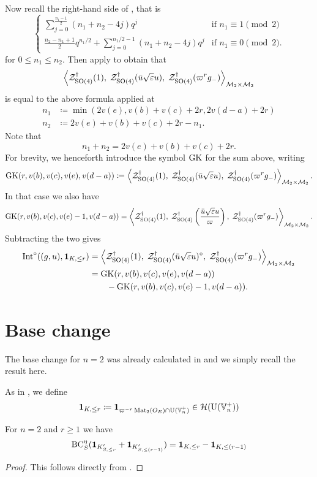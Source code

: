 Now recall the right-hand side of , that is
\[
  \begin{cases}
    \sum_{j=0}^{\frac{n_1-1}{2}} (n_1+n_2-4j) q^j & \text{if } n_1 \equiv 1 \pmod 2 \\
    \frac{n_2-n_1+1}{2} q^{n_1/2} + \sum_{j=0}^{n_1/2-1} (n_1+n_2-4j) q^j & \text{if } n_1 \equiv 0 \pmod 2.
  \end{cases}
\]
for $0 \le n_1 \le n_2$.
Then apply  to obtain that
\[
  \left< \mathcal Z^{\dagger}_{\operatorname{SO}(4)}(1), \;
    \mathcal Z^{\dagger}_{\operatorname{SO}(4)}(\bar u \sqrt{\varepsilon} u), \;
    \mathcal Z^{\dagger}_{\operatorname{SO}(4)}(\varpi^r g_-) \right>_{\mathcal M_2 \times \mathcal M_2}
\]
is equal to the above formula applied at
\begin{align*}
  n_1 &\coloneqq \min(2v(e), v(b)+v(c)+2r, 2v(d-a)+2r) \\
  n_2 &\coloneqq 2v(e) + v(b) + v(c) + 2r - n_1.
\end{align*}
Note that
\[ n_1 + n_2 = 2v(e) + v(b) + v(c) + 2r. \]
For brevity, we henceforth introduce the symbol $\operatorname{GK}$ for the sum above, writing
\[ \operatorname{GK}(r, v(b), v(c), v(e), v(d-a)) \coloneqq
  \left< \mathcal Z^{\dagger}_{\operatorname{SO}(4)}(1), \;
    \mathcal Z^{\dagger}_{\operatorname{SO}(4)}(\bar u \sqrt{\varepsilon} u), \;
    \mathcal Z^{\dagger}_{\operatorname{SO}(4)}(\varpi^r g_-) \right>_{\mathcal M_2 \times \mathcal M_2}. \]
In that case we also have
\[\operatorname{GK}(r, v(b), v(c), v(e)-1, v(d-a)) = \left< \mathcal Z^{\dagger}_{\operatorname{SO}(4)}(1), \;
    \mathcal Z^{\dagger}_{\operatorname{SO}(4)}\left(\frac{\bar u \sqrt{\varepsilon} u}{\varpi}\right), \;
    \mathcal Z^{\dagger}_{\operatorname{SO}(4)}(\varpi^r g_-) \right>_{\mathcal M_2 \times \mathcal M_2}. \]
Subtracting the two gives
\begin{align*}
  \operatorname{Int}^\circ((g,u), \mathbf{1}_{K, \le r}) &=
    \left< \mathcal Z^{\dagger}_{\operatorname{SO}(4)}(1), \;
      \mathcal Z^{\dagger}_{\operatorname{SO}(4)}(\bar u \sqrt{\varepsilon} u)^\circ, \;
      \mathcal Z^{\dagger}_{\operatorname{SO}(4)}(\varpi^r g_-) \right>_{\mathcal M_2 \times \mathcal M_2} \\
  &= \operatorname{GK}(r, v(b), v(c), v(e), v(d-a)) \\
  &\qquad- \operatorname{GK}(r, v(b), v(c), v(e)-1, v(d-a)).
\end{align*}

\section{Base change}
The base change for $n=2$ was already calculated in \cite{ref:AFLspherical}
and we simply recall the result here.

As in , we define
\[ \mathbf{1}_{K, \le r} \coloneqq \mathbf{1}_{\varpi^{-r} \operatorname{Mat}_2(O_E) \cap \operatorname{U}(\mathbb V_n^+)} \in \mathcal H(\operatorname{U}(\mathbb V_n^+)) \]
\begin{lemma}
  \label{lem:finale_base_change}
  For $n = 2$ and $r \ge 1$ we have
  \[
    \operatorname{BC}_S^{\eta}(
      \mathbf{1}_{K'_{S, \le r}}
      + \mathbf{1}_{K'_{S, \le (r-1)}}
      ) = \mathbf{1}_{K, \le r} - \mathbf{1}_{K, \le (r-1)}
  \]
\end{lemma}
\begin{proof}
  This follows directly from \cite[equation (7.1.9)]{ref:AFLspherical}.
\end{proof}

